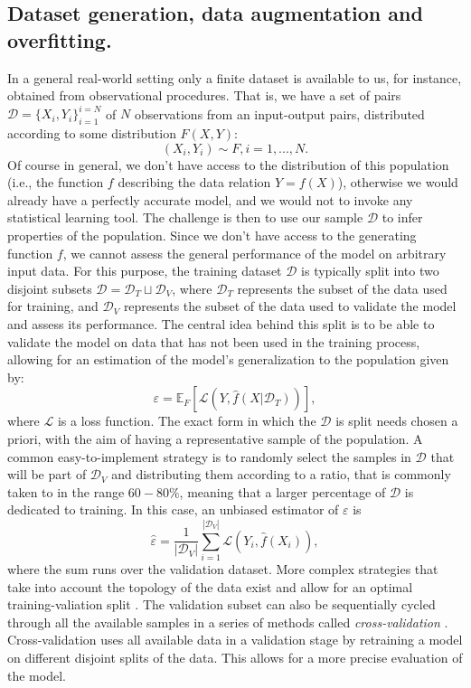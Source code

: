 \subsection{Dataset generation, data augmentation and overfitting.}\label{sec: dataset}

In a general real-world setting only a finite dataset is available to us, for instance, obtained from observational procedures.
That is, we have a set of pairs $\mathcal{D}=\{X_i,Y_i \}_{i=1}^{i=N}$ of $N$ observations from an input-output pairs, distributed according to some distribution $F(X,Y)$:
\begin{equation}
    (X_i,Y_i) \sim F, i=1,...,N.
\end{equation}
Of course in general, we don't have access to the distribution of this population (i.e., the function $f$ describing the data relation $Y=f(X)$), otherwise we would already have a perfectly accurate model, and we would not to invoke any statistical learning tool.
The challenge is then to use our sample $\mathcal{D}$ to infer properties of the population.
Since we don't have access to the generating function $f$, we cannot assess the general performance of the model on arbitrary input data.
For this purpose, the training dataset $\mathcal{D}$ is typically split into two disjoint subsets $\mathcal{D}=\mathcal{D}_T \sqcup \mathcal{D}_V$, where $\mathcal{D}_T$ represents the subset of the data used for training, and $\mathcal{D}_V$ represents the subset of the data used to validate the model and assess its performance.
The central idea behind this split is to be able to validate the model on data that has not been used in the training process, allowing for an estimation of the model's generalization to the population given by:
\begin{equation}\label{eq_ch3:global_loss}
    \varepsilon =\mathbb{E}_F[\mathcal{L}(Y,\hat{f}(X|\mathcal{D}_T))],
\end{equation}
where $\mathcal{L}$ is a loss function.
The exact form in which the $\mathcal{D}$ is split needs chosen a priori, with the aim of having a representative sample of the population.
A common easy-to-implement strategy is to randomly select the samples in $\mathcal{D}$ that will be part of $\mathcal{D}_V$ and distributing them according to a ratio, that is commonly taken to in the range $60-80\%$, meaning that a larger percentage of $\mathcal{D}$ is dedicated to training.
In this case, an unbiased estimator of $\varepsilon$ is
\begin{equation}
    \hat{\varepsilon}=\frac{1}{|\mathcal{D}_V|}\sum_{i=1}^{|\mathcal{D}_V|}\mathcal{L}(Y_i,\hat{f}(X_i)),
\end{equation}
where the sum runs over the validation dataset.
More complex strategies that take into account the topology of the data exist and allow for an optimal training-valiation split \cite{data_split}. 
The validation subset can also be sequentially cycled through all the available samples in a series of methods called \emph{cross-validation} \cite{cross_validation}. Cross-validation uses all available data in a validation stage by retraining a model on different disjoint splits of the data. This allows for a more precise evaluation of the model.


